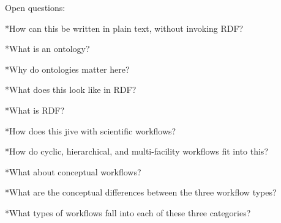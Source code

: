 Open questions: 

*How can this be written in plain text, without invoking RDF?

*What is an ontology?

*Why do ontologies matter here?

*What does this look like in RDF?

*What is RDF?

*How does this jive with scientific workflows?

*How do cyclic, hierarchical, and multi-facility workflows fit into this?

*What about conceptual workflows?

*What are the conceptual differences between the three workflow types?

*What types of workflows fall into each of these three categories? 
